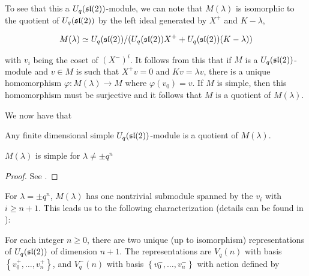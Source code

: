 To see that this a $U_q(\mathfrak{sl}(2))$-module, we can note that $M(\lambda)$ is isomorphic to the quotient of $U_q(\mathfrak{sl}(2))$ by the left ideal generated by $X^+$ and $K-\lambda$,

\begin{equation}
    M(\lambda) \simeq U_q(\mathfrak{sl}(2))/(U_q(\mathfrak{sl}(2)) X^+  + U_q(\mathfrak{sl}(2))(K-\lambda))
\end{equation}

with $v_i$ being the coset of $(X^-)^i$. It follows from this that if $M$ is a
$U_q(\mathfrak{sl}(2))$-module and $v \in M$ is such that $X^+ v = 0$ and $Kv = \lambda v$, there
is a unique homomorphism $\varphi: M(\lambda) \to M$ where $\varphi(v_0) = v$.
If $M$ is simple, then this homomorphism must be  surjective and it follows
that $M$ is a quotient of $M(\lambda)$. 

We now have that 
\begin{claim}
    Any finite dimensional simple $U_q(\mathfrak{sl}(2))$-module is a quotient of $M(\lambda)$.
\end{claim}

\begin{claim}
    $M(\lambda)$ is simple for $\lambda \neq \pm q^n$
\end{claim}

\begin{proof}
    See \cite{Jantzen1995}.
\end{proof}

For $\lambda = \pm q^{n}$, $M(\lambda)$ has one nontrivial submodule spanned by the $v_i$ with $i \geq n+1$.
This leads us to the following characterization (details can be found in \cite{Jantzen1995}):


For each integer $n \geq 0$, there are two unique (up to isomorphism)
representations of $U_q(\mathfrak{sl}(2))$ of dimension $n+1$. 
The representations are $V_q(n)$ with basis $\left\{ v^+_0, \ldots, v^+_n
\right\}$, and $V_q^-(n)$ with basis $\left\{ v^-_0, \ldots, v^-_n \right\}$
with action defined by 

